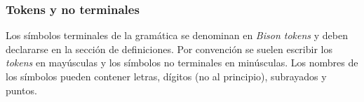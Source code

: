 \subsubsection{Tokens y no terminales}

Los símbolos terminales de la gramática se denominan en \textit{Bison tokens} y deben declararse en la sección de definiciones. Por convención se suelen escribir los \textit{tokens} en mayúsculas y los símbolos no terminales en minúsculas. Los nombres de los símbolos pueden contener letras, dígitos (no al principio), subrayados y puntos. 

\pagebreak